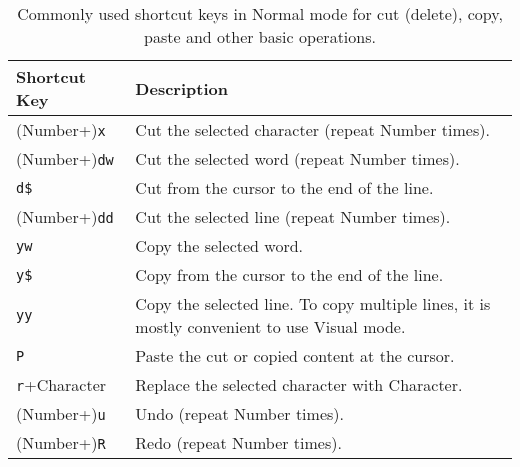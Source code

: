 \documentclass[a4paper]{article}
\begin{document}
\begin{table}
  \centering \caption{Commonly used shortcut keys in Normal mode for cut (delete), copy, paste and other basic operations.}\label{tab:SKeyCutCopyPaste}
  \begin{tabularx}{\textwidth}{lX}
    \hline
    Shortcut Key & Description \\ \hline
    (Number+)\texttt{x} & Cut the selected character (repeat Number times). \\ \hdashline
    (Number+)\texttt{dw} & Cut the selected word (repeat Number times). \\ \hdashline
    \texttt{d\$} & Cut from the cursor to the end of the line. \\ \hdashline
    (Number+)\texttt{dd} & Cut the selected line (repeat Number times). \\ \hdashline
    \texttt{yw} & Copy the selected word. \\ \hdashline
    \texttt{y\$} & Copy from the cursor to the end of the line. \\ \hdashline
    \texttt{yy} & Copy the selected line. To copy multiple lines, it is mostly convenient to use Visual mode. \\ \hdashline
    \texttt{P} & Paste the cut or copied content at the cursor. \\ \hdashline
    \texttt{r}+Character & Replace the selected character with Character. \\ \hdashline
    (Number+)\texttt{u} & Undo (repeat Number times). \\ \hdashline
    (Number+)\texttt{R} & Redo (repeat Number times). \\
    \hline
  \end{tabularx}
\end{table}
\end{document}
